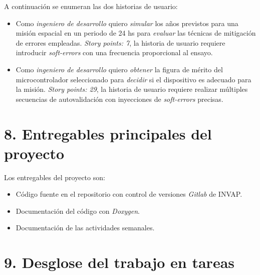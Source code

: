 \documentclass[
11pt, %
]{charter}
\begin{document}
A continuación se enumeran las dos historias de usuario:

\begin{itemize}
	\item Como \emph{ingeniero de desarrollo} quiero \emph{simular} los años previstos para una misión espacial en un periodo de 24 hs para \emph{evaluar} las técnicas de mitigación de errores empleadas. \emph{Story points: 7}, la historia de usuario requiere introducir \emph{soft-errors} con una frecuencia proporcional al ensayo.
	\item Como \emph{ingeniero de desarrollo} quiero \emph{obtener} la figura de mérito del microcontrolador seleccionado para \emph{decidir} si el dispositivo es adecuado para la misión. \emph{Story points: 29}, la historia de usuario requiere realizar múltiples secuencias de autovalidación con inyecciones de \emph{soft-errors} precisas.
\end{itemize}


\section{8. Entregables principales del proyecto}
\label{sec:entregables}

Los entregables del proyecto son:

\begin{itemize}
	\item Código fuente en el repositorio con control de versiones \emph{Gitlab} de INVAP.
	\item Documentación del código con \emph{Doxygen}.
	\item Documentación de las actividades semanales.
\end{itemize}


\section{9. Desglose del trabajo en tareas}
\label{sec:wbs}
\end{document}
